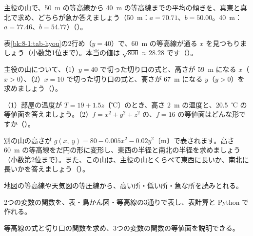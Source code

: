 \bkproblem 主役の山で、\qty{50}{m} の等高線から \qty{40}{m} の等高線までの平均の傾きを、真東と真北で求め、どちらが急か答えましょう（\qty{50}{m}：$a=70.71$、$b=50.00$。\qty{40}{m}：$a=77.46$、$b=54.77$）\mbox{（）}。

\bkproblem 表\ref{bk:8-1:tab-hyou}の2行め（$y=40$）で、\qty{60}{m} の等高線が通る $x$ を見つもりましょう（小数第1位まで）。本当の値は $\sqrt{800}\approx28.28$ です\mbox{（）}。


\bkproblem 主役の山について、（1）$y=40$ で切った切り口の式と、高さが \qty{59}{m} になる $x$（$x>0$）、（2）$x=10$ で切った切り口の式と、高さが \qty{67}{m} になる $y$（$y>0$）を求めましょう\mbox{（）}。

\bkproblem （1）部屋の温度が $T=19+1.5z$〔℃〕のとき、高さ \qty{2}{m} の温度と、\qty{20.5}{℃} の等値面を答えましょう。（2）$f=x^2+y^2+z^2$ の、$f=16$ の等値面はどんな形ですか\mbox{（）}。

\bkproblem 別の山の高さが $g(x,\ y)=80-0.005x^2-0.02y^2$〔m〕で表されます。高さ \qty{60}{m} の等高線をだ円の形に変形し、東西の半径と南北の半径を求めましょう（小数第2位まで）。また、この山は、主役の山とくらべて東西に長いか、南北に長いかを答えましょう\mbox{（）}。

\begin{furikaeri}
\begin{checklist}
\item 地図の等高線や天気図の等圧線から、高い所・低い所・急な所を読みとれる。
\item 2つの変数の関数を、表・鳥かん図・等高線の3通りで表し、表計算と Python で作れる。
\item 等高線の式と切り口の関数を求め、3つの変数の関数の等値面を説明できる。
\end{checklist}
\end{furikaeri}

